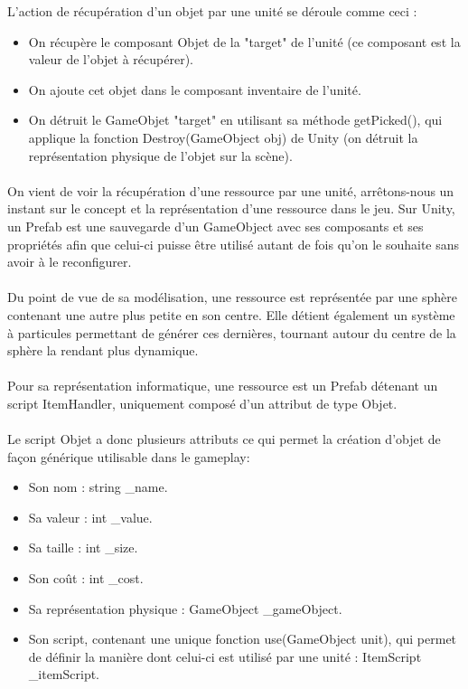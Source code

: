 \documentclass{report}
\begin{document}
L'action de récupération d'un objet par une unité se déroule comme ceci :
\begin{itemize}
\item On récupère le composant Objet de la "target" de l'unité (ce composant est la valeur de l'objet à récupérer).
\item On ajoute cet objet dans le composant inventaire de l'unité.
\item On détruit le GameObjet "target" en utilisant sa méthode getPicked(), qui applique la fonction Destroy(GameObject obj) de Unity (on détruit la représentation physique de l'objet sur la scène).
\end{itemize}
\paragraph{}On vient de voir la récupération d'une ressource par une unité, arrêtons-nous un instant sur le concept et la représentation d'une ressource dans le jeu. Sur Unity, un Prefab est une sauvegarde d'un GameObject avec ses composants et ses propriétés afin que celui-ci puisse être utilisé autant de fois qu'on le souhaite sans avoir à le reconfigurer.

\paragraph{}Du point de vue de sa modélisation, une ressource est représentée par une sphère contenant une autre plus petite en son centre. Elle détient également un système à particules permettant de générer ces dernières, tournant autour du centre de la sphère la rendant plus dynamique. 
\paragraph{} Pour sa représentation informatique, une ressource est un Prefab détenant un script ItemHandler, uniquement composé d'un attribut de type Objet.
\paragraph{}Le script Objet a donc plusieurs attributs ce qui permet la création d'objet de façon générique utilisable dans le gameplay:
\begin{itemize}
\item Son nom : string \_name.
\item Sa valeur : int \_value.
\item Sa taille : int \_size.
\item Son coût : int \_cost.
\item Sa représentation physique : GameObject \_gameObject.
\item Son script, contenant une unique fonction use(GameObject unit), qui permet de définir la manière dont celui-ci est utilisé par une unité : ItemScript \_itemScript.
\end{itemize}
\end{document}
